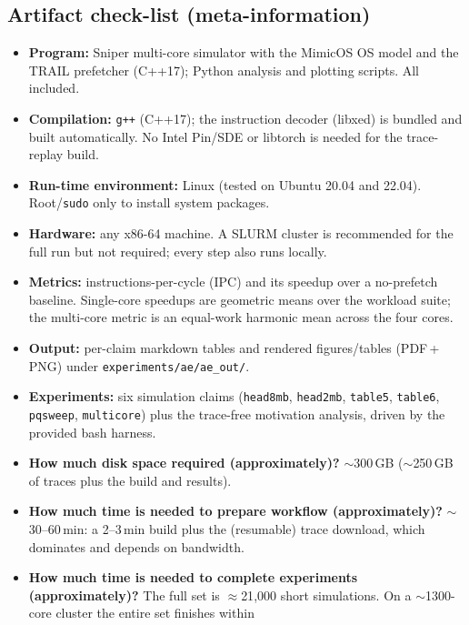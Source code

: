 \subsection{Artifact check-list (meta-information)}

\begin{itemize}
  \item \textbf{Program:} Sniper multi-core simulator with the MimicOS OS
        model and the TRAIL prefetcher (C++17); Python analysis and plotting
        scripts. All included.
  \item \textbf{Compilation:} \texttt{g++} (C++17); the instruction decoder
        (libxed) is bundled and built automatically. No Intel Pin/SDE or
        libtorch is needed for the trace-replay build.
  \item \textbf{Run-time environment:} Linux (tested on Ubuntu 20.04 and
        22.04). Root/\texttt{sudo} only to install system packages.
  \item \textbf{Hardware:} any x86-64 machine. A SLURM cluster is recommended
        for the full run but not required; every step also runs locally.
  \item \textbf{Metrics:} instructions-per-cycle (IPC) and its speedup over a
        no-prefetch baseline. Single-core speedups are geometric means over the
        workload suite; the multi-core metric is an equal-work harmonic mean
        across the four cores.
  \item \textbf{Output:} per-claim markdown tables and rendered figures/tables
        (PDF\,+\,PNG) under \texttt{experiments/ae/ae\_out/}.
  \item \textbf{Experiments:} six simulation claims (\texttt{head8mb},
        \texttt{head2mb}, \texttt{table5}, \texttt{table6}, \texttt{pqsweep},
        \texttt{multicore}) plus the trace-free motivation analysis, driven by
        the provided bash harness.
  \item \textbf{How much disk space required (approximately)?} $\sim$300\,GB
        ($\sim$250\,GB of traces plus the build and results).
  \item \textbf{How much time is needed to prepare workflow (approximately)?}
        $\sim$30--60\,min: a 2--3\,min build plus the (resumable) trace
        download, which dominates and depends on bandwidth.
  \item \textbf{How much time is needed to complete experiments
        (approximately)?} The full set is $\approx$21{,}000 short simulations.
        On a $\sim$1300-core cluster the entire set finishes within

\end{itemize}
